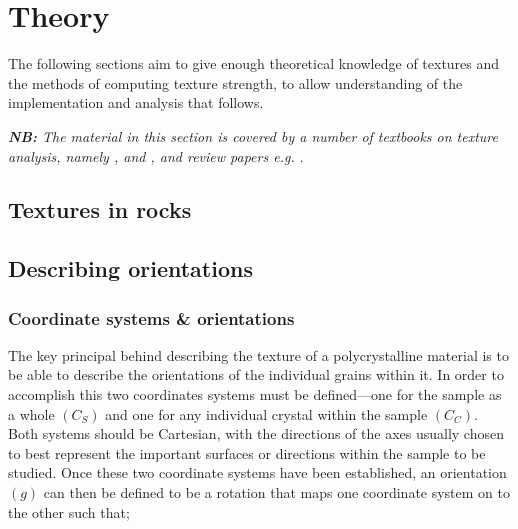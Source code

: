 \documentclass[a4paper,12pt,twoside]{report}
\numberwithin{equation}{chapter}
\begin{document}
\chapter{Theory} \label{chap:theory}
\vspace{-1cm}
The following sections aim to give enough theoretical knowledge of textures and the methods of computing texture strength, to allow understanding of the implementation and analysis that follows.

\noindent
\emph{\textbf{NB:} The material in this section is covered by a number of textbooks on texture analysis, namely \cite{bunge1982texture}, \cite{Bunge1985} and \cite{Randle2000}, and review papers e.g. \cite{Mainprice}}.


\section{Textures in rocks} 

\section{Describing orientations} \label{sec:orientations}





\subsection{Coordinate systems \& orientations} \label{subsec:coordinates}
The key principal behind describing the texture of a polycrystalline material is to be able to describe the orientations of the individual grains within it. In order to accomplish this two coordinates systems must be defined---one for the sample as a whole $(C_S)$ and one for any individual crystal within the sample $(C_C)$. Both systems should be Cartesian, with the directions of the axes usually chosen to best represent the important surfaces or directions within the sample to be studied. Once these two coordinate systems have been established, an orientation $(g)$ can then be defined to be a rotation that maps one coordinate system on to the other such that;
\end{document}
